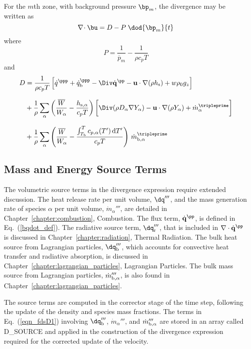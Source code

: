 For the $m$th zone, with background pressure $\bp_m$, the divergence may be written as
\begin{equation}
\label{eqn_divfromeos}
\nabla\!\cdot \bu = {D} - {P}\; \dod{\bp_m}{t}
\end{equation}
where
\begin{equation}
\label{eqn_fdsP1}
P = \frac{1}{\overline{p}_m} - \frac{1}{\rho c_p T}
\end{equation}
and
\begin{align}
\label{eqn_fdsD1}
D &= \frac{1}{\rho c_p T}\left[ \dot{q}^\ppp + \dot{q}_{\rm b}^\ppp - \Div \dot{\mathbf{q}}^\pp - \mathbf{u} \cdot\nabla (\rho h_{\rm s}) + w \rho_0 g_z\right] \notag\\[.1in]
&+ \frac{1}{\rho} \sum_\alpha \left(\frac{\overline{W}}{W_\alpha} - \frac{h_{\rm s,\alpha}}{c_p T} \right) \bigg[ \Div (\rho D_\alpha \nabla Y_\alpha) - \mathbf{u} \cdot \nabla (\rho Y_\alpha) +\dot{m}_\alpha^\tripleprime  \bigg] \notag \\[.1in]
&+ \frac{1}{\rho} \sum_\alpha \left(\frac{\overline{W}}{W_\alpha} - \frac{\int_{T_{\rm b}}^T c_{p,\alpha}(T') \, {\rm d}T'}{c_p T} \right) \, \dot{m}_{\rm b,\alpha}^\tripleprime
\end{align}

\subsection{Mass and Energy Source Terms}
\label{div_source_terms}

The volumetric source terms in the divergence expression require extended discussion.  The heat release rate per unit volume, $\dq'''$, and the mass generation rate of species $\alpha$ per unit volume, $\dot{m}_\alpha'''$, are detailed in Chapter~\ref{chapter:combustion}, Combustion. The flux term, $\dot{\mathbf{q}}^\pp$, is defined in Eq.~(\ref{bqdot_def}). The radiative source term, $\dq_{\rm r}'''$, that is included in $\nabla \cdot \dot{\mathbf{q}}^\pp$ is discussed in Chapter~\ref{chapter:radiation}, Thermal Radiation.  The bulk heat source from Lagrangian particles, $\dq_{\rm b}'''$, which accounts for convective heat transfer and radiative absorption, is discussed in Chapter~\ref{chapter:lagrangian_particles}, Lagrangian Particles.  The bulk mass source from Lagrangian particles, $\dot{m}_{\rm b,\alpha}'''$, is also found in Chapter~\ref{chapter:lagrangian_particles}.

The source terms are computed in the corrector stage of the time step, following the update of the density and species mass fractions. The terms in Eq.~(\ref{eqn_fdsD1}) involving $\dq_{\rm b}'''$, $\dot{m}_\alpha'''$, and $\dot{m}_{\rm b,\alpha}'''$ are stored in an array called {\ct D\_SOURCE} and applied in the construction of the divergence expression required for the corrected update of the velocity.

